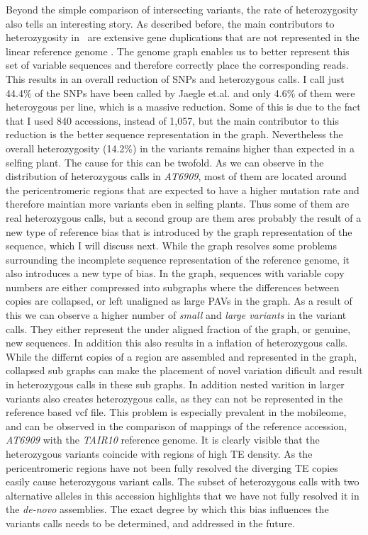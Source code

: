 Beyond the simple comparison of intersecting variants, the rate of heterozygosity also tells an interesting story. As described before, the main contributors to heterozygosity in \ath\ are extensive gene duplications that are not represented in the linear reference genome \citep{Jaegle2021-jw}. The genome graph enables us to better represent this set of variable sequences and therefore correctly place the corresponding reads. This results in an overall reduction of SNPs and heterozygous calls. I call just 44.4\% of the SNPs have been called by Jaegle et.al. and only 4.6\% of them were heteroygous per line, which is a massive reduction. Some of this is due to the fact that I used 840 accessions, instead of 1,057, but the main contributor to this reduction is the better sequence representation in the graph. Nevertheless the overall heterozygosity (14.2\%) in the variants remains higher than expected in a selfing plant. The cause for this can be twofold. As we can observe in the distribution of heterozygous calls in \textit{AT6909}, most of them are located around the pericentromeric regions that are expected to have a higher mutation rate and therefore maintian more variants eben in selfing plants. Thus some of them are real heterozygous calls, but a second group are them ares probably the result of a new type of reference bias that is introduced by the graph representation of the sequence, which I will discuss next. \newline
While the graph resolves some problems surrounding the incomplete sequence representation of the reference genome, it also introduces a new type of bias. In the graph, sequences with variable copy numbers are either compressed into subgraphs where the differences between copies are collapsed, or left unaligned as large PAVs in the graph. As a result of this we can observe a higher number of \textit{small} and \textit{large variants} in the variant calls. They either represent the under aligned fraction of the graph, or genuine, new sequences. In addition this also results in a inflation of heterozygous calls. While the differnt copies of a region are assembled and represented in the graph, collapsed sub graphs can make the placement of novel variation dificult and result in heterozygous calls in these sub graphs. In addition nested varition in larger variants also creates heterozygous calls, as they can not be represented in the reference based vcf file. This problem is especially prevalent in the mobileome, and can be observed in the comparison of mappings of the reference accession, \textit{AT6909} with the \textit{TAIR10} reference genome. It is clearly visible that the heterozygous variants coincide with regions of high TE density. As the pericentromeric regions have not been fully resolved the diverging TE copies easily cause heterozygous variant calls. The subset of heterozygous calls with two alternative alleles in this accession highlights that we have not fully resolved it in the \textit{de-novo} assemblies. The exact degree by which this bias influences the variants calls needs to be determined, and addressed in the future.


